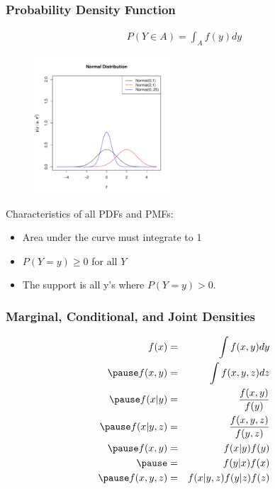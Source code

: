 \documentclass[handout]{beamer}
\begin{document}
\begin{frame}
\frametitle{Probability Density Function}
\pause
\begin{eqnarray*}
P(Y \in A) = \int_A f(y) dy
\end{eqnarray*}
\pause
\begin{figure}[!htp]
\begin{center}
\includegraphics[width=2in, height=2in]{probability-normal.pdf}
\end{center}
\end{figure}
\end{frame}

\begin{frame}
Characteristics of all PDFs and PMFs:
\bigskip
\pause
\begin{itemize}
\item Area under the curve must integrate to 1
\pause
\item $P(Y = y) \ge 0$ for all $Y$
\pause
\item The support is all y's where $P(Y = y) > 0$.
\end{itemize}
\end{frame}

\begin{frame}
\frametitle{Marginal, Conditional, and Joint Densities}
\pause
\begin{eqnarray*}
f(x) &=& \int f(x,y) dy\\
\pause
f(x,y) &=& \int f(x,y,z) dz\\
\pause
f(x|y) &=& \frac{f(x,y)}{f(y)}\\
\pause
f(x|y,z) &=& \frac{f(x,y,z)}{f(y,z)}\\
\pause
f(x,y) &=& f(x | y) f(y)\\
\pause
&=& f(y | x) f(x) \\
\pause
f(x,y,z) &=& f(x | y,z) f(y|z) f(z)
\end{eqnarray*}
\end{frame}
\end{document}
